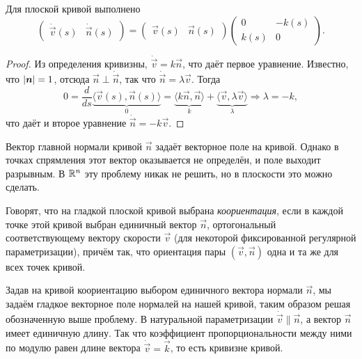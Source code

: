 \begin{theorem}
	Для плоской кривой выполнено
	\begin{equation} \label{eq:PlaneFrenet}
		\begin{pmatrix}
			\dot{\vec{v}}(s) & \dot{\vec{n}}(s)
		\end{pmatrix} = 
		\begin{pmatrix}
			\vec{v}(s) & \vec{n}(s)
		\end{pmatrix}
		\begin{pmatrix}
			0 & -k(s)\\
			k(s) & 0
		\end{pmatrix}.
	\end{equation}
\end{theorem}

\begin{proof}
	Из определения кривизны, $\dot{\vec{v}} = k\vec{n}$, что даёт первое уравнение. Известно, что $\left\lvert\boldsymbol{n}\right\rvert = 1$, отсюда $\vec{n} \perp \dot{\vec{n}}$, так что $\dot{\vec{n}} = \lambda\vec{v}$. Тогда
	\[
		0 = \frac{d}{ds}\underbrace{\langle \vec{v}(s), \vec{n}(s)\rangle}_{0} = \underbrace{\langle k\vec{n}, \vec{n}\rangle}_{k} + \underbrace{\langle \vec{v}, \lambda\vec{v} \rangle}_{\lambda} \Rightarrow \lambda = -k,
	\]
	что даёт и второе уравнение $\dot{\vec{n}} = -k\vec{v}$.
\end{proof}

Вектор главной нормали кривой $\vec{n}$ задаёт векторное поле на кривой. Однако в точках спрямления этот вектор оказывается не определён, и поле выходит разрывным. В $\mathbb{R}^n$ эту проблему никак не решить, но в плоскости это можно сделать.

\begin{definition}
	Говорят, что на гладкой плоской кривой выбрана \textit{коориентация}, если в каждой точке этой кривой выбран единичный вектор $\vec{n}$, ортогональный соответствующему вектору скорости $\vec{v}$ (для некоторой фиксированной регулярной параметризации), причём так, что ориентация пары $(\vec{v}, \vec{n})$ одна и та же для всех точек кривой\footnotemark{}.
\end{definition}


Задав на кривой коориентацию выбором единичного вектора нормали $\vec{n}$, мы задаём гладкое векторное поле нормалей на нашей кривой, таким образом решая обозначенную выше проблему. В натуральной параметризации $\dot{\vec{v}} \parallel \vec{n}$, а вектор $\vec{n}$ имеет единичную длину. Так что коэффициент пропорциональности между ними по модулю равен длине вектора $\dot{\vec{v}} = \vec{k}$, то есть кривизне кривой.

